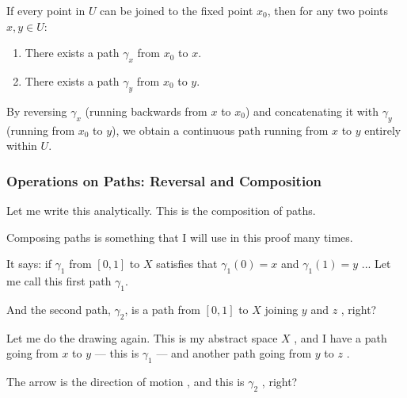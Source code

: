 \begin{proofWrapper}
\begin{content}
\begin{steps}
If every point in $U$ can be joined to the fixed point $x_0$, then for any two points $x, y \in U$:
\begin{enumerate}[label=\textbf{(\arabic*)}]
    \item There exists a path $\gamma_x$ from $x_0$ to $x$.
    \item There exists a path $\gamma_y$ from $x_0$ to $y$.
\end{enumerate}
By reversing $\gamma_x$ (running backwards from $x$ to $x_0$) and concatenating it with $\gamma_y$ (running from $x_0$ to $y$), we obtain a continuous path running from $x$ to $y$ entirely within $U$.
\end{steps}
\end{content}

\subsubsection{Operations on Paths: Reversal and Composition}

\begin{speech}[00:54:10 - 00:55:55]
Let me write this analytically. This is the composition of paths.

Composing paths  is something that I will use in this proof many times.

It says: if $\gamma_1$ from $[0, 1]$ to $X$  satisfies that $\gamma_1(0) = x$  and $\gamma_1(1) = y$ ... Let me call this first path $\gamma_1$.

And the second path, $\gamma_2$, is a path from $[0, 1]$ to $X$  joining $y$ and $z$ , right?

Let me do the drawing again. This is my abstract space $X$ , and I have a path going from $x$ to $y$  --- this is $\gamma_1$ --- and another path going from $y$ to $z$ .

The arrow is the direction of motion , and this is $\gamma_2$ , right?
\end{speech}


\end{proofWrapper}
